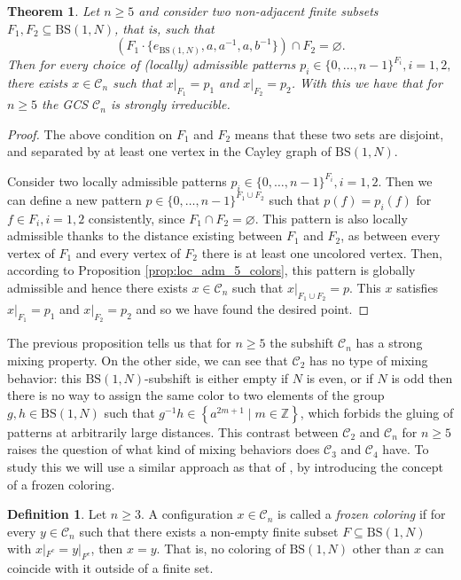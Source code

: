 \documentclass[letterpaper,11pt,reqno]{amsart}
\theoremstyle{plain}
\newtheorem{theorem}{Theorem}[section]
\theoremstyle{definition}
\newtheorem{definition}{Definition}[section]
\theoremstyle{cupremark}
\newcommand{\BS}[1][N]{\mathrm{BS}(1,#1)}
\begin{document}
\begin{theorem}\label{thm:gcs_mixing_n5} Let $n\ge 5$ and consider two non-adjacent finite subsets $F_1,F_2\subseteq \BS$, that is, such that 
	$$\left( F_1\cdot \{e_{\BS},a,a^{-1},a,b^{-1}\}\right)\cap F_2=\varnothing.$$
	Then for every choice of (locally) admissible patterns $p_i\in \{0,\ldots,n-1\}^{F_i}, i=1,2,$ there exists $x\in \mathcal{C}_n$ such that $x|_{F_1}=p_1$ and $x|_{F_2}=p_2$. With this we have that for $n\ge 5$ the GCS $\mathcal{C}_n$ is strongly irreducible.
\end{theorem}
\begin{proof}
	The above condition on $F_1$ and $F_2$ means that these two sets are disjoint, and separated by at least one vertex in the Cayley graph of $\BS$. 
	
	Consider two locally admissible patterns $p_i\in \{0,\ldots,n-1\}^{F_i}, i=1,2$. Then we can define a new pattern $p\in \{0,\ldots,n-1\}^{F_1\cup F_2}$ such that $p(f)=p_i(f)$ for $f\in F_i, i=1,2$ consistently, since $F_1\cap F_2=\varnothing.$ This pattern is also locally admissible thanks to the distance existing between $F_1$ and $F_2$, as between every vertex of $F_1$ and every vertex of $F_2$ there is at least one uncolored vertex. Then, according to Proposition \ref{prop:loc_adm_5_colors}, this pattern is globally admissible and hence there exists $x\in \mathcal{C}_n$ such that $x|_{F_1\cup F_2}=p$. This $x$ satisfies $x|_{F_1}=p_1$ and $x|_{F_2}=p_2$ and so we have found the desired point.
\end{proof}


The previous proposition tells us that for $n\ge 5$ the subshift $\mathcal{C}_n$ has a strong mixing property. On the other side, we can see that $\mathcal{C}_2$ has no type of mixing behavior: this $\BS$-subshift is either empty if $N$ is even, or if $N$ is odd then there is no way to assign the same color to two elements of the group $g,h\in \BS$ such that $g^{-1}h\in \left\{a^{2m+1}\mid m\in \mathbb{Z} \right\}$, which forbids the gluing of patterns at arbitrarily large distances. This contrast between $\mathcal{C}_2$ and $\mathcal{C}_n$ for $n\ge 5$ raises the question of what kind of mixing behaviors does $\mathcal{C}_3$ and $\mathcal{C}_4$ have. To study this we will use a similar approach as that of \cite{alon2019mixing}, by introducing the concept of a frozen coloring.
\begin{definition} Let $n\ge 3$. A configuration $x\in \mathcal{C}_n$ is called a \textit{frozen coloring} if for every $y\in \mathcal{C}_n$ such that there exists a non-empty finite subset $F\subseteq \BS$ with $x|_{F^c}=y|_{F^c}$, then $x= y$. That is, no coloring of $\BS$ other than $x$ can coincide with it outside of a finite set.
\end{definition}
\end{document}
